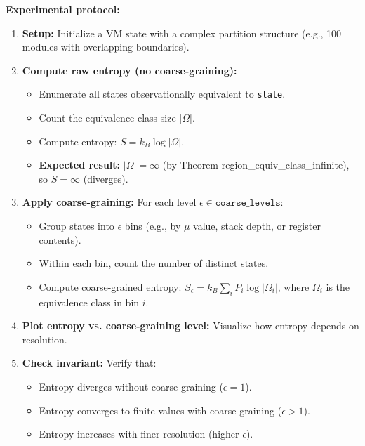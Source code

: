 \textbf{Experimental protocol:}
\begin{enumerate}
    \item \textbf{Setup:} Initialize a VM state with a complex partition structure (e.g., 100 modules with overlapping boundaries).
    
    \item \textbf{Compute raw entropy (no coarse-graining):}
    \begin{itemize}
        \item Enumerate all states observationally equivalent to \texttt{state}.
        \item Count the equivalence class size $|\Omega|$.
        \item Compute entropy: $S = k_B \log |\Omega|$.
        \item \textbf{Expected result:} $|\Omega| = \infty$ (by Theorem region\_equiv\_class\_infinite), so $S = \infty$ (diverges).
    \end{itemize}
    
    \item \textbf{Apply coarse-graining:} For each level $\epsilon \in \texttt{coarse\_levels}$:
    \begin{itemize}
        \item Group states into $\epsilon$ bins (e.g., by $\mu$ value, stack depth, or register contents).
        \item Within each bin, count the number of distinct states.
        \item Compute coarse-grained entropy: $S_{\epsilon} = k_B \sum_i P_i \log |\Omega_i|$, where $\Omega_i$ is the equivalence class in bin $i$.
    \end{itemize}
    
    \item \textbf{Plot entropy vs. coarse-graining level:} Visualize how entropy depends on resolution.
    
    \item \textbf{Check invariant:} Verify that:
    \begin{itemize}
        \item Entropy diverges without coarse-graining ($\epsilon = 1$).
        \item Entropy converges to finite values with coarse-graining ($\epsilon > 1$).
        \item Entropy increases with finer resolution (higher $\epsilon$).
    \end{itemize}
\end{enumerate}

